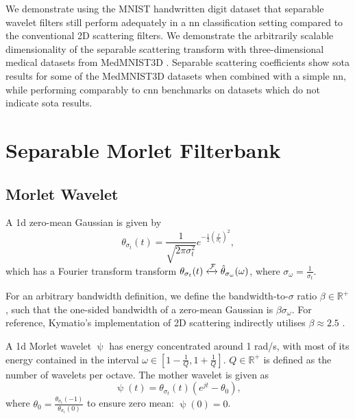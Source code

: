 We demonstrate using the MNIST handwritten digit dataset \cite{mnist} that separable wavelet filters still perform adequately in a \ac{nn} classification setting compared to the conventional 2D scattering filters. We demonstrate the arbitrarily scalable dimensionality of the separable scattering transform with three-dimensional medical datasets from MedMNIST3D \cite{medmnist}. Separable scattering coefficients show \ac{sota} results for some of the MedMNIST3D datasets when combined with a simple \ac{nn}, while performing comparably to \ac{cnn} benchmarks on datasets which do not indicate \ac{sota} results.

\section{Separable Morlet Filterbank}


\subsection{Morlet Wavelet}

A \ac{1d} zero-mean Gaussian is given by
\begin{equation}
    \theta_{\sigma_t}(t) = \frac{1}{\sqrt{2\pi\sigma_t^2}}e^{-\frac{1}{2}\left(\frac{t}{\sigma_t}\right)^2},
\end{equation}
which has a Fourier transform transform $\theta_{\sigma_t}(t) \xleftrightarrow{\mathcal{F}} \hat{\theta}_{\sigma_\omega}(\omega)$, where $\sigma_\omega = \frac{1}{\sigma_t}$.

For an arbitrary bandwidth definition, we define the bandwidth-to-$\sigma$ ratio $\beta \in \mathbb{R}^+$, such that the one-sided bandwidth of a zero-mean Gaussian is $\beta \sigma_\omega$. For reference, Kymatio's implementation of 2D scattering indirectly utilises $\beta \approx 2.5$ \cite{kymatio}.


A \ac{1d} Morlet wavelet $\uppsi$ has energy concentrated around 1 rad/s, with most of its energy contained in the interval $\omega \in [1 - \frac{1}{Q}, 1 + \frac{1}{Q}]$. $Q \in \mathbb{R}^+$ is defined as the number of wavelets per octave. The mother wavelet is given as
\begin{equation}
    \uppsi(t) = \theta_{\sigma_t}(t)\left(e^{jt} - \theta_0 \right),
\end{equation}
where $\theta_0 = \frac{\theta_{\sigma_t}(-1)}{\theta_{\sigma_t}(0)}$ to ensure zero mean: $\hat{\uppsi}(0) = 0$.


